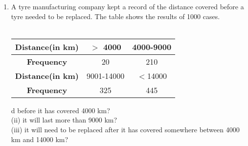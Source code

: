 \renewcommand{\theequation}{\theenumi}
\begin{enumerate}[label=\arabic*.,ref=\thesubsection.\theenumi]
\item A tyre manufacturing company kept a record of the distance covered
before a tyre needed to be replaced. The table shows the results of 1000 cases.\\
\\
	\begin{tabular}{ |c|c|c| } 
		\hline
		\textbf{Distance(in km)} &$>$ 4000 &4000-9000 \\ 
		\hline
		\textbf{Frequency} &20 &210\\ 
		\hline
		\textbf{Distance(in km)}  &9001-14000 &$<$14000 \\ 
		\hline
		\textbf{Frequency}  &325 &445\\ 
		\hline
	\end{tabular}%
d before it has covered 4000 km?\\
(ii) it will last more than 9000 km?\\
(iii) it will need to be replaced after it has covered somewhere between 4000 km and 14000 km?\\
\end{enumerate}